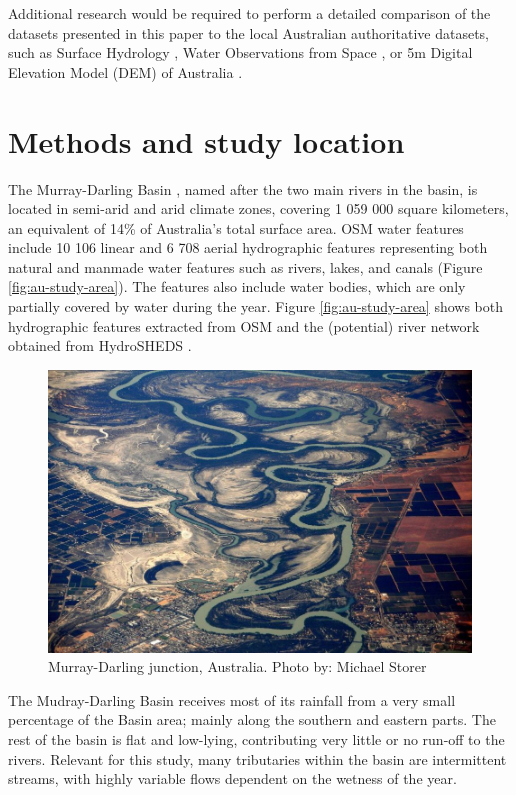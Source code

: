 Additional research would be required to perform a detailed comparison of the datasets presented in this paper to the local Australian authoritative datasets, such as Surface Hydrology \citet{CrossmanSLi2015}, Water Observations from Space \citet{Mueller2015}, or 5m Digital Elevation Model (DEM) of Australia \citet{dataAUDEM5m}.

\section{Methods and study location}
The Murray-Darling Basin \citet{webMurrayDarlingAuthority}, named after the two main rivers in the basin, is located in semi-arid and arid climate zones, covering 1 059 000 square kilometers, an equivalent of 14\% of Australia’s total surface area. OSM water features include 10 106 linear and 6 708 aerial hydrographic features representing both natural and manmade water features such as rivers, lakes, and canals (Figure \ref{fig:au-study-area}). The features also include water bodies, which are only partially covered by water during the year. Figure \ref{fig:au-study-area} shows both hydrographic features extracted from OSM and the (potential) river network obtained from HydroSHEDS \citet{Lehner2008}. 

\begin{figure}[H]
	\centering
	\includegraphics[width=1\textwidth]{01.9-water-murray-darling/figures/water_Murray-Darling-junction}
	\caption{Murray-Darling junction, Australia. Photo by: Michael Storer}
\end{figure}


The Mudray-Darling Basin receives most of its rainfall from a very small percentage of the Basin area; mainly along the southern and eastern parts. The rest of the basin is flat and low-lying, contributing very little or no run-off to the rivers. Relevant for this study, many tributaries within the basin are intermittent streams, with highly variable flows dependent on the wetness of the year.

